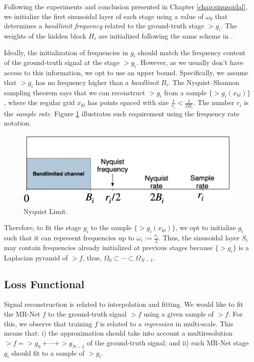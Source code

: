 Following the experiments and conclusion presented in Chapter \ref{chap:sinusoidal}, we initialize the first sinusoidal layer of each stage using a value of $\omega_0$ that determines a \textit{bandlimit frequency} related to the ground-truth stage $\gt{g}_i$. The weights of the hidden block $H_i$ are initialized following the same scheme in \cite{sitzmann2019siren}.

Ideally, the initialization of frequencies in $g_i$ should match the frequency content of the ground-truth signal at the stage $\gt{g}_i$. However, as we usually don't have access to this information, we opt to use an upper bound. Specifically, we assume that $\gt{g}_i$ has no frequency higher than a \textit{bandlimit} $B_i$. The Nyquist–Shannon sampling theorem says that we can reconstruct $\gt{g}_i$ from a sample $\{\gt{g}_i(x_{kl})\}$, where the regular grid $x_{kl}$ has points spaced with size $\frac{1}{r_i}<\frac{1}{2B_i}$. The number $r_i$ is the \textit{sample rate}. Figure \ref{f:nyquist} illustrates such requirement using the frequency rate notation.  

\begin{figure}[!h]
\centering
\includegraphics[width=0.7\linewidth]{img/ch4/nyquist.png}
\caption{Nyquist Limit.}
\label{f:nyquist}
\end{figure}


Therefore, to fit the stage $g_i$ to the sample $\{\gt{g}_i(x_{kl})\}$, we opt to initialize $g_i$ such that it can represent frequencies up to $\omega_i:=\frac{r_i}{2}$.
Thus, the sinusoidal layer $S_i$ may contain frequencies already initialized at previous stages because $\{\gt{g}_i\}$ is a Laplacian pyramid of $\gt{f}$, thus, $\Omega_0\subset \cdots \subset \Omega_{N-1}$. 

\subsection{Loss Functional}

Signal reconstruction is related to interpolation and fitting. We would like to fit the MR-Net $f$ to the ground-truth signal $\gt{f}$ using a given sample of $\gt{f}$.
For this, we observe that training $f$ is related to a \textit{regression} in multi-scale. This means that: i) the approximation should take into account a multiresolution $\gt{f}=\gt{g}_0+\cdots+\gt{g}_{N-1}$ of the ground-truth signal; and ii) each MR-Net stage $g_i$ should fit to a sample of $\gt{g}_i$.


